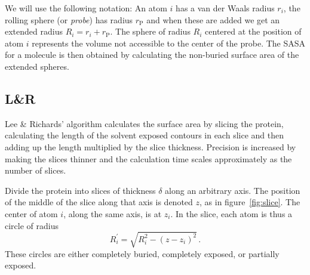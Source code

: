 \documentclass[a4paper,11pt]{article}
\begin{document}
We will use the following notation: An atom $i$ has a van der Waals
radius $r_i$, the rolling sphere (or \emph{probe}) has radius
$r_\text{P}$ and when these are added we get an extended radius $R_i =
r_i + r_\text{P}$. The sphere of radius $R_i$ centered at the position
of atom $i$ represents the volume not accessible to the center of the
probe. The SASA for a molecule is then obtained by calculating the
non-buried surface area of the extended spheres.

\subsection{L\&R} \label{sec:alg_LnR}

Lee \& Richards' algorithm calculates the surface area by slicing the
protein, calculating the length of the solvent exposed contours in
each slice and then adding up the length multiplied by the slice
thickness. Precision is increased by making the slices thinner and the
calculation time scales approximately as the number of slices.

Divide the protein into slices of thickness $\delta$ along an
arbitrary axis. The position of the middle of the slice along that
axis is denoted $z$, as in figure~\ref{fig:slice}. The center of atom
$i$, along the same axis, is at $z_i$. In the slice, each atom is thus
a circle of radius $$R_i^\prime = \sqrt{R_i^2-(z-z_i)^2}\,.$$ These
circles are either completely buried, completely exposed, or partially
exposed.
\end{document}
